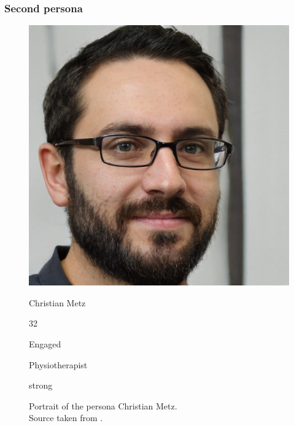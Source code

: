 \documentclass[conference]{IEEEtran}
\begin{document}
\subsubsection{Second persona} \hfill
\begin{figure}[H]
	\centering
	\begin{minipage}{0.4\linewidth}
		\centerline{\includegraphics[width=\linewidth]{images/persona02.jpg}}
		\caption[Portrait of the persona Christian Metz; Source taken from \cite{personaimg}.]
		{Portrait of the persona Christian Metz.\\ Source taken from \cite{personaimg}.\endtabular}
		\label{fig:persona2}
	\end{minipage}
	\hfill
	\begin{minipage}{0.5\linewidth}
		\vspace{-25pt}
		\begin{description}[labelindent=-0.3cm]
			\item[Name] Christian Metz
			\item[Age] 32
			\item[Marital status] Engaged
			\item[Occupation] Physiotherapist
			\item[Computer skills] strong
		\end{description}
	\end{minipage}
\end{figure}
\end{document}
